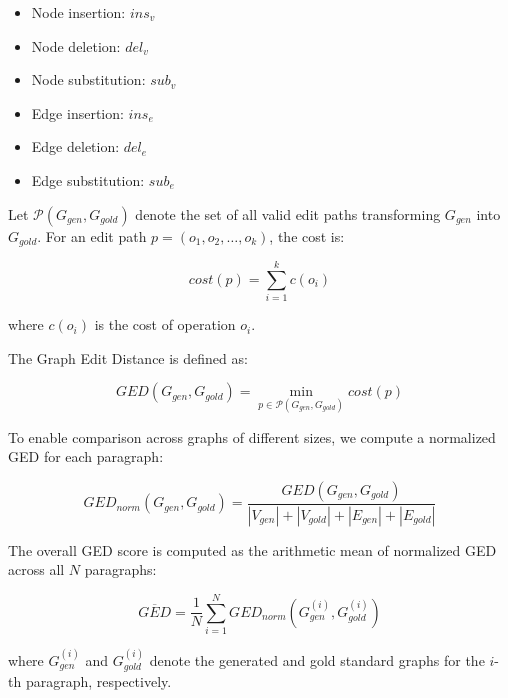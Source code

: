 \documentclass[preprint,12pt]{elsarticle}
\begin{document}
\begin{itemize}
    \item Node insertion: $ins_v$
    \item Node deletion: $del_v$
    \item Node substitution: $sub_v$
    \item Edge insertion: $ins_e$
    \item Edge deletion: $del_e$
    \item Edge substitution: $sub_e$
\end{itemize}

Let $\mathcal{P}(G_{gen}, G_{gold})$ denote the set of all valid edit paths transforming $G_{gen}$ into $G_{gold}$. For an edit path $p = (o_1, o_2, \ldots, o_k)$, the cost is:

$$
cost(p) = \sum_{i=1}^{k} c(o_i)
$$

where $c(o_i)$ is the cost of operation $o_i$.

The Graph Edit Distance is defined as:

$$
GED(G_{gen}, G_{gold}) = \min_{p \in \mathcal{P}(G_{gen}, G_{gold})} cost(p)
$$

To enable comparison across graphs of different sizes, we compute a normalized GED for each paragraph:

$$
GED_{norm}(G_{gen}, G_{gold}) = \frac{GED(G_{gen}, G_{gold})}{|V_{gen}| + |V_{gold}| + |E_{gen}| + |E_{gold}|}
$$

The overall GED score is computed as the arithmetic mean of normalized GED across all $N$ paragraphs:

$$
\overline{GED} = \frac{1}{N} \sum_{i=1}^{N} GED_{norm}(G_{gen}^{(i)}, G_{gold}^{(i)})
$$

where $G_{gen}^{(i)}$ and $G_{gold}^{(i)}$ denote the generated and gold standard graphs for the $i$-th paragraph, respectively.


 



\end{document}
